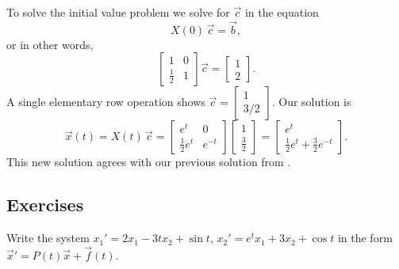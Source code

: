 \begin{example}
To solve the initial value problem we solve for $\vec{c}$ in the equation
\begin{equation*}
X(0)\,\vec{c} = \vec{b} ,
\end{equation*}
or in other words,
\begin{equation*}
\begin{bmatrix}
1 & 0 \\
\frac{1}{2} & 1
\end{bmatrix} 
\vec{c} = 
\begin{bmatrix}
1 \\ 2
\end{bmatrix} .
\end{equation*}
A single elementary row operation shows
$\vec{c} =
\left[ \begin{smallmatrix} 1 \\ 3/2 \end{smallmatrix} \right]$.
Our solution is
\begin{equation*}
\vec{x}(t) = 
X(t)\,\vec{c} = 
\begin{bmatrix}
e^t & 0 \\
\frac{1}{2} e^t & e^{-t}
\end{bmatrix}
\begin{bmatrix}
1 \\ \frac{3}{2}
\end{bmatrix} =
\begin{bmatrix}
e^t \\
\frac{1}{2} e^t + \frac{3}{2} e^{-t}
\end{bmatrix} .
\end{equation*}
This new solution agrees with our previous solution from .
\end{example}

\subsection{Exercises}

\begin{exercise}
Write the system $x_1' = 2 x_1 - 3t x_2 + \sin t$,
$x_2' = e^t x_1 + 3 x_2 + \cos t$ in the form
${\vec{x}}' = P(t) \vec{x} + \vec{f}(t)$.
\end{exercise}

